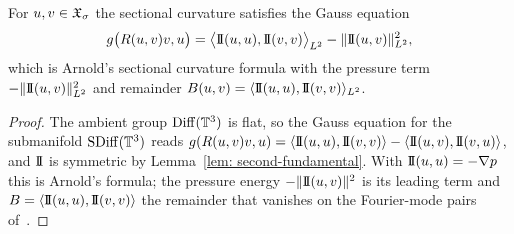 \begin{proposition}\label{prop: gauss}
For $u, v \in \mathfrak{X}_\sigma$ the sectional
curvature satisfies the Gauss equation
\begin{equation}\label{eq: gauss}
  g\bigl(R(u,v)v, u\bigr)
  = \bigl\langle \mathrm{I\!I}(u,u), \mathrm{I\!I}(v,v) \bigr\rangle_{L^2}
  - \lVert \mathrm{I\!I}(u,v) \rVert_{L^2}^2,
\end{equation}
which is Arnold's sectional curvature formula with the pressure term
$-\lVert \mathrm{I\!I}(u,v) \rVert_{L^2}^2$ and remainder
$B(u,v) = \langle \mathrm{I\!I}(u,u), \mathrm{I\!I}(v,v)\rangle_{L^2}$.
\end{proposition}

\begin{proof}
The ambient group $\operatorname{Diff}(\mathbb{T}^3)$ is flat, so the Gauss equation for the
submanifold $\operatorname{SDiff}(\mathbb{T}^3)$ reads
$g(R(u,v)v,u) = \langle\mathrm{I\!I}(u,u),\mathrm{I\!I}(v,v)\rangle - \langle\mathrm{I\!I}(u,v),\mathrm{I\!I}(v,u)\rangle$,
and $\mathrm{I\!I}$ is symmetric by Lemma~\ref{lem: second-fundamental}. With
$\mathrm{I\!I}(u,u) = -\nabla p$ this is Arnold's formula; the pressure energy
$-\lVert \mathrm{I\!I}(u,v) \rVert^2$ is its leading term and $B = \langle\mathrm{I\!I}(u,u),\mathrm{I\!I}(v,v)\rangle$
the remainder that vanishes on the Fourier-mode pairs of~\cite{arnold-1998-top-met-hyd}.
\end{proof}
